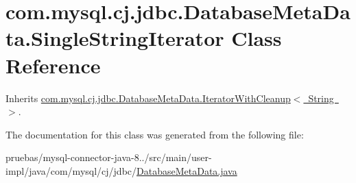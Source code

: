 \hypertarget{classcom_1_1mysql_1_1cj_1_1jdbc_1_1_database_meta_data_1_1_single_string_iterator}{}\section{com.\+mysql.\+cj.\+jdbc.\+Database\+Meta\+Data.\+Single\+String\+Iterator Class Reference}
\label{classcom_1_1mysql_1_1cj_1_1jdbc_1_1_database_meta_data_1_1_single_string_iterator}


Inherits \mbox{\hyperlink{classcom_1_1mysql_1_1cj_1_1jdbc_1_1_database_meta_data_1_1_iterator_with_cleanup}{com.\+mysql.\+cj.\+jdbc.\+Database\+Meta\+Data.\+Iterator\+With\+Cleanup$<$ String $>$}}.



The documentation for this class was generated from the following file\+:\begin{DoxyCompactItemize}
\item 
pruebas/mysql-\/connector-\/java-\/8../src/main/user-\/impl/java/com/mysql/cj/jdbc/\mbox{\hyperlink{_database_meta_data_8java}{Database\+Meta\+Data.\+java}}\end{DoxyCompactItemize}
